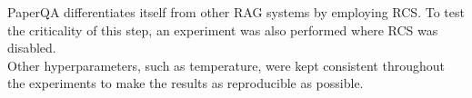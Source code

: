 PaperQA differentiates itself from other RAG systems by employing RCS. To test the criticality of this step, an experiment was also performed where RCS was disabled. \\

Other hyperparameters, such as temperature, were kept consistent throughout the experiments to make the results as reproducible as possible. \\


